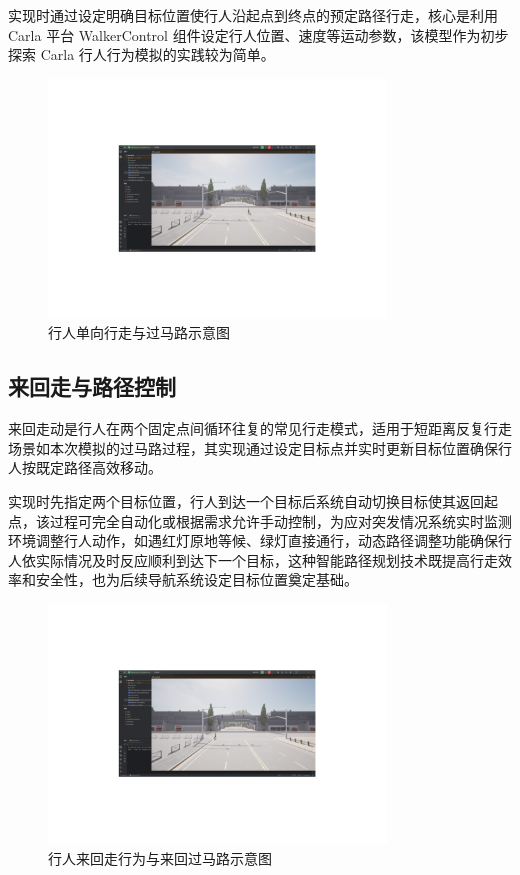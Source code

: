 实现时通过设定明确目标位置使行人沿起点到终点的预定路径行走，核心是利用 Carla 平台 WalkerControl 组件设定行人位置、速度等运动参数，该模型作为初步探索 Carla 行人行为模拟的实践较为简单。

\begin{figure}[H]
    \centering
    \includegraphics[width=0.8\textwidth]{images/crossing_path.pdf}
    \caption{行人单向行走与过马路示意图}
    \label{f.crossing_path}
\end{figure}

\subsection{来回走与路径控制}
来回走动是行人在两个固定点间循环往复的常见行走模式，适用于短距离反复行走场景如本次模拟的过马路过程，其实现通过设定目标点并实时更新目标位置确保行人按既定路径高效移动。

实现时先指定两个目标位置，行人到达一个目标后系统自动切换目标使其返回起点，该过程可完全自动化或根据需求允许手动控制，为应对突发情况系统实时监测环境调整行人动作，如遇红灯原地等候、绿灯直接通行，动态路径调整功能确保行人依实际情况及时反应顺利到达下一个目标，这种智能路径规划技术既提高行走效率和安全性，也为后续导航系统设定目标位置奠定基础。

\begin{figure}[H]
    \centering
    \includegraphics[width=0.8\textwidth]{images/walking_back_and_forth.pdf}
    \caption{行人来回走行为与来回过马路示意图}
    \label{f.walking_back_and_forth}
\end{figure}

